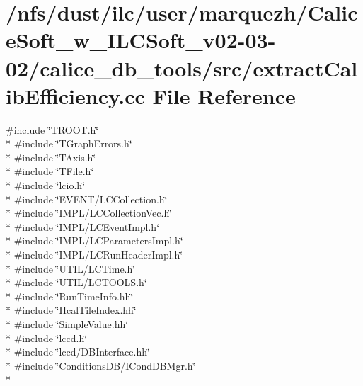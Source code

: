 \section{/nfs/dust/ilc/user/marquezh/\-Calice\-Soft\-\_\-w\-\_\-\-I\-L\-C\-Soft\-\_\-v02-\/03-\/02/calice\-\_\-db\-\_\-tools/src/extract\-Calib\-Efficiency.cc File Reference}
\label{extractCalibEfficiency_8cc}
{\ttfamily \#include \char`\"{}T\-R\-O\-O\-T.\-h\char`\"{}}\\*
{\ttfamily \#include \char`\"{}T\-Graph\-Errors.\-h\char`\"{}}\\*
{\ttfamily \#include \char`\"{}T\-Axis.\-h\char`\"{}}\\*
{\ttfamily \#include \char`\"{}T\-File.\-h\char`\"{}}\\*
{\ttfamily \#include \char`\"{}lcio.\-h\char`\"{}}\\*
{\ttfamily \#include \char`\"{}E\-V\-E\-N\-T/\-L\-C\-Collection.\-h\char`\"{}}\\*
{\ttfamily \#include \char`\"{}I\-M\-P\-L/\-L\-C\-Collection\-Vec.\-h\char`\"{}}\\*
{\ttfamily \#include \char`\"{}I\-M\-P\-L/\-L\-C\-Event\-Impl.\-h\char`\"{}}\\*
{\ttfamily \#include \char`\"{}I\-M\-P\-L/\-L\-C\-Parameters\-Impl.\-h\char`\"{}}\\*
{\ttfamily \#include \char`\"{}I\-M\-P\-L/\-L\-C\-Run\-Header\-Impl.\-h\char`\"{}}\\*
{\ttfamily \#include \char`\"{}U\-T\-I\-L/\-L\-C\-Time.\-h\char`\"{}}\\*
{\ttfamily \#include \char`\"{}U\-T\-I\-L/\-L\-C\-T\-O\-O\-L\-S.\-h\char`\"{}}\\*
{\ttfamily \#include \char`\"{}Run\-Time\-Info.\-hh\char`\"{}}\\*
{\ttfamily \#include \char`\"{}Hcal\-Tile\-Index.\-hh\char`\"{}}\\*
{\ttfamily \#include \char`\"{}Simple\-Value.\-hh\char`\"{}}\\*
{\ttfamily \#include \char`\"{}lccd.\-h\char`\"{}}\\*
{\ttfamily \#include \char`\"{}lccd/\-D\-B\-Interface.\-hh\char`\"{}}\\*
{\ttfamily \#include \char`\"{}Conditions\-D\-B/\-I\-Cond\-D\-B\-Mgr.\-h\char`\"{}}\\*
